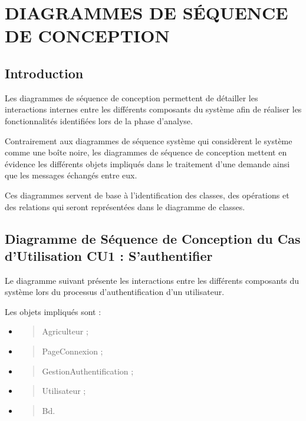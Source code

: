 \hypertarget{chapitre-4-diagrammes-de-suxe9quence-de-conception}{%
\chapter{DIAGRAMMES DE SÉQUENCE DE CONCEPTION}\label{chapitre-4-diagrammes-de-suxe9quence-de-conception}}

\hypertarget{introduction-2}{%
\section{Introduction}\label{introduction-2}}

Les diagrammes de séquence de conception permettent de détailler les
interactions internes entre les différents composants du système afin de
réaliser les fonctionnalités identifiées lors de la phase d'analyse.

Contrairement aux diagrammes de séquence système qui considèrent le
système comme une boîte noire, les diagrammes de séquence de conception
mettent en évidence les différents objets impliqués dans le traitement
d'une demande ainsi que les messages échangés entre eux.

Ces diagrammes servent de base à l'identification des classes, des
opérations et des relations qui seront représentées dans le diagramme de
classes.

\hypertarget{diagramme-de-suxe9quence-de-conception-du-cas-dutilisation-cu1-sauthentifier}{%
\section{Diagramme de Séquence de Conception du Cas d'Utilisation CU1 : S'authentifier}\label{diagramme-de-suxe9quence-de-conception-du-cas-dutilisation-cu1-sauthentifier}}

Le diagramme suivant présente les interactions entre les différents
composants du système lors du processus d'authentification d'un
utilisateur.

Les objets impliqués sont :

\begin{itemize}
\item
  \begin{quote}
  Agriculteur ;
  \end{quote}
\item
  \begin{quote}
  PageConnexion ;
  \end{quote}
\item
  \begin{quote}
  GestionAuthentification ;
  \end{quote}
\item
  \begin{quote}
  Utilisateur ;
  \end{quote}
\item
  \begin{quote}
  Bd.
  \end{quote}
\end{itemize}

